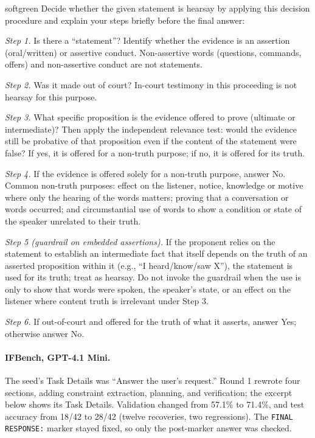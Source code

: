 \documentclass[10pt]{article} %
\begin{document}
\begin{promptbox}[title={\textbf{Hearsay: returned Task Details} (round 2 excerpt)},fontupper=\small]{softgreen}
Decide whether the given statement is hearsay by applying this decision procedure and explain your steps
briefly before the final answer:\par
\textit{Step 1.} Is there a ``statement''? Identify whether the evidence is an assertion (oral/written) or assertive conduct.
Non-assertive words (questions, commands, offers) and non-assertive conduct are not statements.\par
\textit{Step 2.} Was it made out of court? In-court testimony in this proceeding is not hearsay for this purpose.\par
\textit{Step 3.} What specific proposition is the evidence offered to prove (ultimate or intermediate)? Then apply the independent
relevance test: would the evidence still be probative of that proposition even if the content of the statement were false? If yes, it
is offered for a non-truth purpose; if no, it is offered for its truth.\par
\textit{Step 4.} If the evidence is offered solely for a non-truth purpose, answer No. Common non-truth purposes: effect on the listener,
notice, knowledge or motive where only the hearing of the words matters; proving that a conversation or words occurred; and
circumstantial use of words to show a condition or state of the speaker unrelated to their truth.\par
\textit{Step 5 (guardrail on embedded assertions).} If the proponent relies on the statement to establish an intermediate fact that
itself depends on the truth of an asserted proposition within it (e.g., ``I heard/know/saw X''), the statement is used for its
truth; treat as hearsay. Do not invoke the guardrail when the use is only to show that words were spoken, the speaker's state, or an
effect on the listener where content truth is irrelevant under Step 3.\par
\textit{Step 6.} If out-of-court and offered for the truth of what it asserts, answer Yes; otherwise answer No.
\end{promptbox}

\paragraph{IFBench, GPT-4.1 Mini.}
The seed's Task Details was ``Answer the user's request.'' Round 1 rewrote four sections, adding constraint extraction,
planning, and verification; the excerpt below shows its Task Details. Validation changed from 57.1\% to 71.4\%, and
test accuracy from 18/42 to 28/42 (twelve recoveries, two regressions). The \texttt{FINAL RESPONSE:} marker stayed fixed,
so only the post-marker answer was checked.
\end{document}
